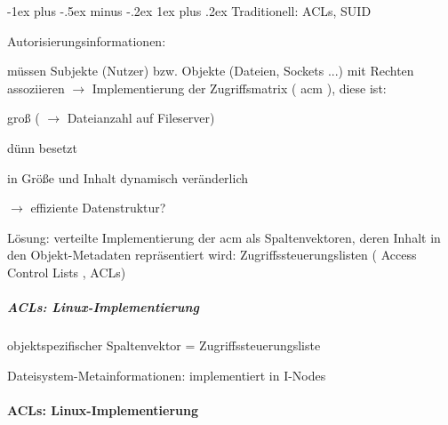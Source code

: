 \documentclass[a4paper]{article}
\makeatletter
\renewcommand{\subsubsection}{\@startsection{subsubsection}{3}{0mm}%
 {-1ex plus -.5ex minus -.2ex}%
 {1ex plus .2ex}%
 {\normalfont\small\bfseries}}
\makeatother
\begin{document}
\begin{multicols}{3}
    \subsubsection{Traditionell: ACLs, SUID}

    Autorisierungsinformationen:

    \begin{itemize*}
        \item
        müssen Subjekte (Nutzer) bzw. Objekte (Dateien, Sockets ...) mit
        Rechten assoziieren $\rightarrow$ Implementierung der
        Zugriffsmatrix ( acm ), diese ist:
        \begin{itemize*}
            \item groß ( $\rightarrow$ Dateianzahl auf Fileserver)
            \item dünn besetzt
            \item in Größe und Inhalt dynamisch veränderlich
            \item $\rightarrow$ effiziente Datenstruktur?
        \end{itemize*}
        \item
        Lösung: verteilte Implementierung der acm als Spaltenvektoren, deren
        Inhalt in den Objekt-Metadaten repräsentiert wird:
        Zugriffssteuerungslisten ( Access Control Lists , ACLs)
    \end{itemize*}


    \subparagraph{ACLs:
        Linux-Implementierung}

    \begin{itemize*}
        \item
        objektspezifischer Spaltenvektor = Zugriffssteuerungsliste
        \item
        Dateisystem-Metainformationen: implementiert in I-Nodes
    \end{itemize*}



    \paragraph{ACLs:
        Linux-Implementierung}


\end{multicols}
\end{document}

